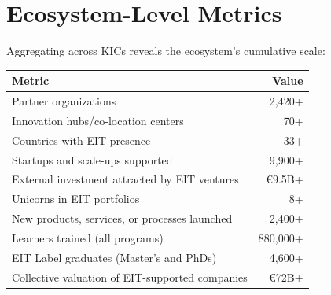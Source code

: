 \documentclass[../main.tex]{subfiles}
\begin{document}
\section*{Ecosystem-Level Metrics}

Aggregating across KICs reveals the ecosystem's cumulative scale:

\tableminimal
\begin{center}
\begin{tabular}{@{}lr@{}}
\toprule
\textbf{Metric} & \textbf{Value} \\
\midrule
Partner organizations & 2,420+ \\
Innovation hubs/co-location centers & 70+ \\
Countries with EIT presence & 33+ \\
Startups and scale-ups supported & 9,900+ \\
External investment attracted by EIT ventures & €9.5B+ \\
Unicorns in EIT portfolios & 8+ \\
New products, services, or processes launched & 2,400+ \\
Learners trained (all programs) & 880,000+ \\
EIT Label graduates (Master's and PhDs) & 4,600+ \\
Collective valuation of EIT-supported companies & €72B+ \\
\bottomrule
\end{tabular}
\end{center}
\end{document}
